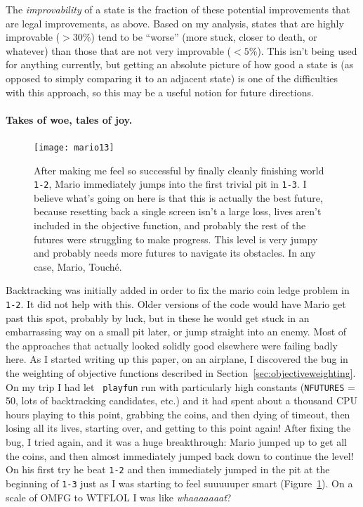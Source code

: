 \documentclass[twocolumn]{article}
\begin{document}
The {\em improvability} of a state is the fraction of these potential
improvements that are legal improvements, as above. Based on my
analysis, states that are highly improvable ($> 30\%$) tend to be
``worse'' (more stuck, closer to death, or whatever) than those that
are not very improvable ($< 5\%$). This isn't being used for anything
currently, but getting an absolute picture of how good a state is (as
opposed to simply comparing it to an adjacent state) is one of the
difficulties with this approach, so this may be a useful notion for
future directions.

\paragraph{Takes of woe, tales of joy.} 
\begin{figure}[h!t!b]
\begin{center}
\texttt{[image: mario13]}
\end{center}\vspace{-0.1in}
\caption{After making me feel so successful by finally cleanly
  finishing world {\tt 1-2}, Mario immediately jumps into the first
  trivial pit in {\tt 1-3}. I believe what's going on here is that
  this is actually the best future, because resetting back a single
  screen isn't a large loss, lives aren't included in the objective
  function, and probably the rest of the futures were struggling to
  make progress. This level is very jumpy and probably needs more
  futures to navigate its obstacles. In any case, Mario, Touch\'e.}
\label{fig:mario13}
\end{figure}

Backtracking was initially added in order to fix the mario coin ledge
problem in {\tt 1-2}. It did not help with this. Older versions of the
code would have Mario get past this spot, probably by luck, but in
these he would get stuck in an embarrassing way on a small pit later,
or jump straight into an enemy. Most of the approaches that actually
looked solidly good elsewhere were failing badly here. As I started
writing up this paper, on an airplane, I discovered the bug in the
weighting of objective functions described in
Section~\ref{sec:objectiveweighting}. On my trip I had let {\tt
  playfun} run with particularly high constants ({\tt NFUTURES} = 50,
lots of backtracking candidates, etc.) and it had spent about a
thousand CPU hours playing to this point, grabbing the coins, and then
dying of timeout, then losing all its lives, starting over, and
getting to this point again! After fixing the bug, I tried again, and
it was a huge breakthrough: Mario jumped up to get all the coins, and
then almost immediately jumped back down to continue the level! On his
first try he beat {\tt 1-2} and then immediately jumped in the pit at
the beginning of {\tt 1-3} just as I was starting to feel suuuuuper
smart (Figure~\ref{fig:mario13}). On a scale of OMFG to WTFLOL I was
like {\em whaaaaaaat}?
\end{document}
